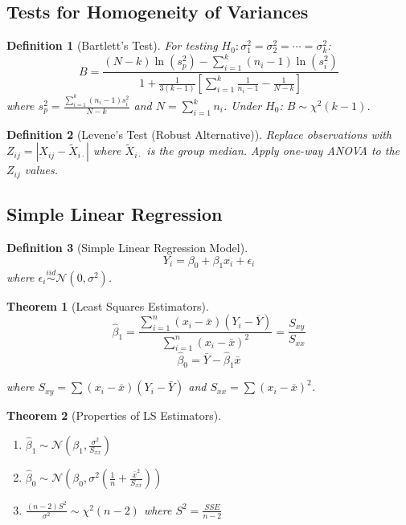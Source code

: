 \documentclass[12pt,a4paper]{amsart}
\newtheorem{theorem}{Theorem}[section]
\newtheorem{definition}{Definition}[section]
\theoremstyle{remark}
\begin{document}
\subsection{Tests for Homogeneity of Variances}

\begin{definition}[Bartlett's Test]
For testing $H_0: \sigma_1^2 = \sigma_2^2 = \cdots = \sigma_k^2$:
$$B = \frac{(N-k)\ln(s_p^2) - \sum_{i=1}^k (n_i-1)\ln(s_i^2)}{1 + \frac{1}{3(k-1)}[\sum_{i=1}^k \frac{1}{n_i-1} - \frac{1}{N-k}]}$$
where $s_p^2 = \frac{\sum_{i=1}^k (n_i-1)s_i^2}{N-k}$ and $N = \sum_{i=1}^k n_i$.
Under $H_0$: $B \sim \chi^2(k-1)$.
\end{definition}

\begin{definition}[Levene's Test (Robust Alternative)]
Replace observations with $Z_{ij} = |X_{ij} - \tilde{X}_{i\cdot}|$ where $\tilde{X}_{i\cdot}$ is the group median.
Apply one-way ANOVA to the $Z_{ij}$ values.
\end{definition}

\subsection{Simple Linear Regression}

\begin{definition}[Simple Linear Regression Model]
$$Y_i = \beta_0 + \beta_1 x_i + \epsilon_i$$
where $\epsilon_i \stackrel{iid}{\sim} \mathcal{N}(0, \sigma^2)$.
\end{definition}

\begin{theorem}[Least Squares Estimators]
$$\hat{\beta}_1 = \frac{\sum_{i=1}^n (x_i - \bar{x})(Y_i - \bar{Y})}{\sum_{i=1}^n (x_i - \bar{x})^2} = \frac{S_{xy}}{S_{xx}}$$
$$\hat{\beta}_0 = \bar{Y} - \hat{\beta}_1 \bar{x}$$

where $S_{xy} = \sum(x_i - \bar{x})(Y_i - \bar{Y})$ and $S_{xx} = \sum(x_i - \bar{x})^2$.
\end{theorem}

\begin{theorem}[Properties of LS Estimators]
\begin{enumerate}
\item $\hat{\beta}_1 \sim \mathcal{N}\left(\beta_1, \frac{\sigma^2}{S_{xx}}\right)$
\item $\hat{\beta}_0 \sim \mathcal{N}\left(\beta_0, \sigma^2\left(\frac{1}{n} + \frac{\bar{x}^2}{S_{xx}}\right)\right)$
\item $\frac{(n-2)S^2}{\sigma^2} \sim \chi^2(n-2)$ where $S^2 = \frac{SSE}{n-2}$
\end{enumerate}
\end{theorem}
\end{document}
